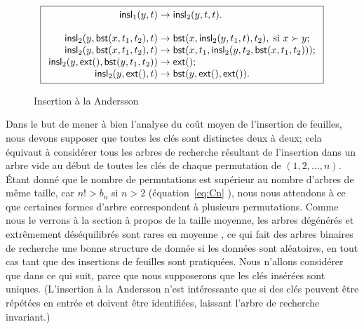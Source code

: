 \begin{figure}
\begin{equation*}
\boxed{
\begin{array}{r@{\;}l@{\;}l}
\fun{insl}_1(y,t) & \rightarrow & \fun{insl}_2(y,t,t).\\
\\
\fun{insl}_2(y,\fun{bst}(x,t_1,t_2),t) & \rightarrow &
  \fun{bst}(x,\fun{insl}_2(y,t_1,t),t_2), \; \text{si \(x \succ y\)};\\
\fun{insl}_2(y,\fun{bst}(x,t_1,t_2),t) & \rightarrow &
  \fun{bst}(x,t_1,\fun{insl}_2(y,t_2,\fun{bst}(x,t_1,t_2)));\\
\fun{insl}_2(y,\fun{ext}(),\fun{bst}(y,t_1,t_2)) & \rightarrow & \fun{ext}();\\
\fun{insl}_2(y,\fun{ext}(),t) & \rightarrow & \fun{bst}(y,\fun{ext}(),\fun{ext}()).
\end{array}}
\end{equation*}
\caption{Insertion à la Andersson}
\label{fig:insl1}
\end{figure}


Dans le but de mener à bien l'analyse du coût moyen de l'insertion de
feuilles, nous devons supposer que toutes les clés sont distinctes
deux à deux; cela équivaut à considérer tous les arbres de recherche
résultant de l'insertion dans un arbre vide au début de toutes les
clés de chaque permutation de \((1,2,\dots,n)\). Étant donné que le
nombre de permutations est supérieur au nombre d'arbres de même
taille, car \(n! > b_n\) si \(n > 2\) (équation~\eqref{eq:Cn}
), nous nous attendons à ce que certaines formes
d'arbre correspondent à plusieurs permutations. Comme nous le verrons
à la section à propos de la taille moyenne, les arbres dégénérés et
extrêmement déséquilibrés sont rares en moyenne \citep{Fill_1996}, ce
qui fait des arbres binaires de recherche une bonne structure de
donnée si les données sont aléatoires, en tout cas tant que des
insertions de feuilles sont pratiquées. Nous n'allons considérer que
 dans ce qui suit, parce que nous supposerons que les clés
insérées sont uniques. (L'insertion à la Andersson n'est intéressante
que si des clés peuvent être répétées en entrée et doivent être
identifiées, laissant l'arbre de recherche invariant.)

